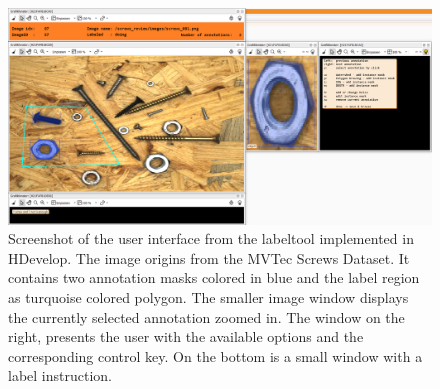 \begin{figure}
	\includegraphics[width=\linewidth]{figures/chap45_labeltool_scrennshot.png}
	\caption[Screenshot of the user interface from the labeltool]{		
		Screenshot of the user interface from the labeltool implemented in HDevelop.
		The image origins from the MVTec Screws Dataset.
		It contains two annotation masks colored in blue and the label region as turquoise colored polygon.
		The smaller image window displays the currently selected annotation zoomed in.
		The window on the right, presents the user with the available options and the corresponding control key.
		On the bottom is a small window with a label instruction.
	}
	\label{fig:ch4:sec4:labeltool}
\end{figure}

